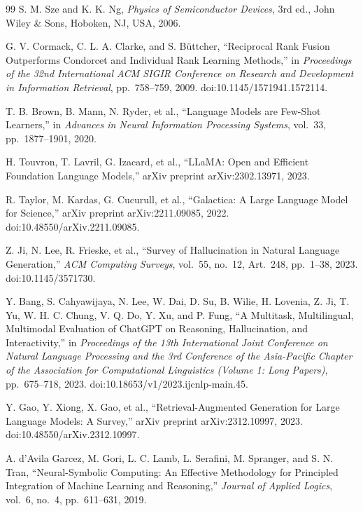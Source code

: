 \documentclass[a4paper,fleqn]{cas-sc}
\begin{document}
\begin{thebibliography}{99}
S. M. Sze and K. K. Ng,
\textit{Physics of Semiconductor Devices},
3rd ed.,
John Wiley \& Sons,
Hoboken, NJ, USA,
2006.

G. V. Cormack, C. L. A. Clarke, and S. B{\"u}ttcher,
``Reciprocal Rank Fusion Outperforms Condorcet and Individual Rank Learning Methods,''
in \textit{Proceedings of the 32nd International ACM SIGIR Conference on Research and Development in Information Retrieval},
pp.~758--759,
2009.
doi:10.1145/1571941.1572114.

T. B. Brown, B. Mann, N. Ryder, et al.,
``Language Models are Few-Shot Learners,''
in \textit{Advances in Neural Information Processing Systems},
vol.~33,
pp.~1877--1901,
2020.

H. Touvron, T. Lavril, G. Izacard, et al.,
``LLaMA: Open and Efficient Foundation Language Models,''
arXiv preprint arXiv:2302.13971, 2023.

R. Taylor, M. Kardas, G. Cucurull, et al.,
``Galactica: A Large Language Model for Science,''
arXiv preprint arXiv:2211.09085, 2022.
doi:10.48550/arXiv.2211.09085.

Z. Ji, N. Lee, R. Frieske, et al.,
``Survey of Hallucination in Natural Language Generation,''
\textit{ACM Computing Surveys},
vol.~55,
no.~12,
Art.~248,
pp.~1--38,
2023.
doi:10.1145/3571730.

Y. Bang, S. Cahyawijaya, N. Lee, W. Dai, D. Su, B. Wilie, H. Lovenia, Z. Ji, T. Yu, W. H. C. Chung, V. Q. Do, Y. Xu, and P. Fung,
``A Multitask, Multilingual, Multimodal Evaluation of ChatGPT on Reasoning, Hallucination, and Interactivity,''
in \textit{Proceedings of the 13th International Joint Conference on Natural Language Processing and the 3rd Conference of the Asia-Pacific Chapter of the Association for Computational Linguistics (Volume 1: Long Papers)},
pp.~675--718,
2023.
doi:10.18653/v1/2023.ijcnlp-main.45.

Y. Gao, Y. Xiong, X. Gao, et al.,
``Retrieval-Augmented Generation for Large Language Models: A Survey,''
arXiv preprint arXiv:2312.10997, 2023.
doi:10.48550/arXiv.2312.10997.

A. d'Avila Garcez, M. Gori, L. C. Lamb, L. Serafini, M. Spranger, and S. N. Tran,
``Neural-Symbolic Computing: An Effective Methodology for Principled Integration of Machine Learning and Reasoning,''
\textit{Journal of Applied Logics},
vol.~6,
no.~4,
pp.~611--631,
2019.


\end{thebibliography}
\end{document}
